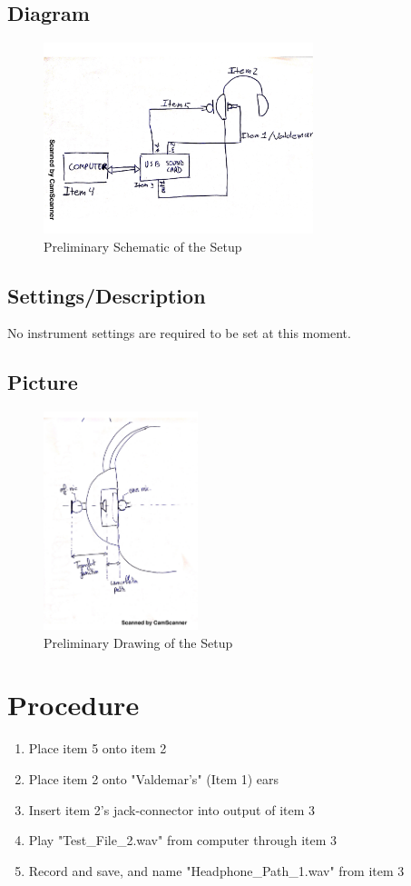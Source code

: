 \documentclass[12pt,a4paper,openright]{article}
\begin{document}
\subsection{Diagram}
\begin{figure}[H]
	\centering
	\includegraphics[width=0.7\textwidth]{Schem.png}
	\caption{Preliminary Schematic of the Setup}
	\label{Schematic}
\end{figure}

\subsection{Settings/Description}
No instrument settings are required to be set at this moment.

\subsection{Picture}
\begin{figure}[H]
	\centering
	\includegraphics[width=0.4\textwidth]{picture.png}
	\caption{Preliminary Drawing of the Setup}
	\label{PictureDrawing}
\end{figure}

\section{Procedure}
\begin{enumerate}
	\item Place item 5 onto item 2
	\item Place item 2 onto "Valdemar's" (Item 1) ears
	\item Insert item 2's jack-connector into output of item 3
	\item Play "Test\_File\_2.wav" from computer through item 3
	\item Record and save, and name "Headphone\_Path\_1.wav" from item 3
\end{enumerate}
\end{document}
